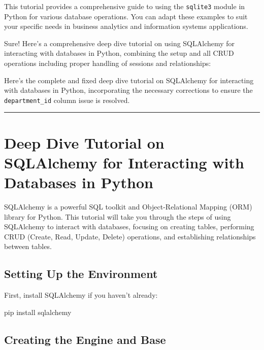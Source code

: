 \documentclass[
  letterpaper,
  DIV=11,
  numbers=noendperiod]{scrreprt}
\newenvironment{Shaded}{\begin{snugshade}}{\end{snugshade}}
\newcommand{\ExtensionTok}[1]{\textcolor[rgb]{0.00,0.23,0.31}{#1}}
\newcommand{\NormalTok}[1]{\textcolor[rgb]{0.00,0.23,0.31}{#1}}
\begin{document}
This tutorial provides a comprehensive guide to using the
\texttt{sqlite3} module in Python for various database operations. You
can adapt these examples to suit your specific needs in business
analytics and information systems applications.

Sure! Here's a comprehensive deep dive tutorial on using SQLAlchemy for
interacting with databases in Python, combining the setup and all CRUD
operations including proper handling of sessions and relationships:

Here's the complete and fixed deep dive tutorial on SQLAlchemy for
interacting with databases in Python, incorporating the necessary
corrections to ensure the \texttt{department\_id} column issue is
resolved.

\begin{center}\rule{0.5\linewidth}{0.5pt}\end{center}


\chapter{Deep Dive Tutorial on SQLAlchemy for Interacting with Databases
in
Python}\label{deep-dive-tutorial-on-sqlalchemy-for-interacting-with-databases-in-python}

SQLAlchemy is a powerful SQL toolkit and Object-Relational Mapping (ORM)
library for Python. This tutorial will take you through the steps of
using SQLAlchemy to interact with databases, focusing on creating
tables, performing CRUD (Create, Read, Update, Delete) operations, and
establishing relationships between tables.

\section{Setting Up the Environment}\label{setting-up-the-environment}

First, install SQLAlchemy if you haven't already:

\begin{Shaded}
\begin{Highlighting}[]
\ExtensionTok{pip}\NormalTok{ install sqlalchemy}
\end{Highlighting}
\end{Shaded}

\section{Creating the Engine and
Base}\label{creating-the-engine-and-base}
\end{document}

